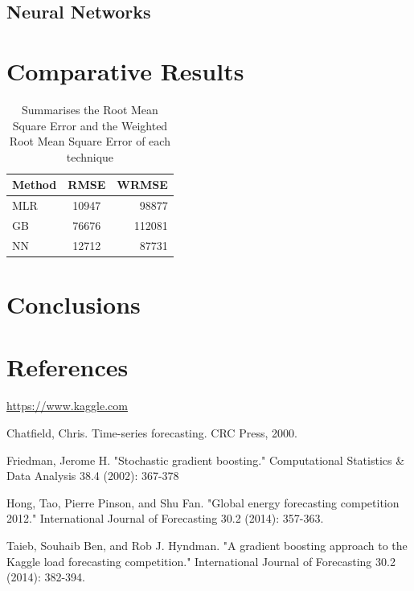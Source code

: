 \documentclass{article} %
\begin{document}
\subsection*{Neural Networks}

\section*{Comparative Results}

\begin{table}
  \begin{tabular}{l c r}
    Method  & RMSE & WRMSE \\
    \hline
    MLR     & 10947 & 98877 \\
    GB      & 76676 & 112081 \\
    NN      & 12712 & 87731 \\
  \end{tabular}
  \caption{Summarises the Root Mean Square Error and the Weighted Root Mean Square Error of each technique}
  \label{tab:error_comp}
\end{table}
\section*{Conclusions}


\section*{References}
\url{https://www.kaggle.com}


Chatfield, Chris. Time-series forecasting. CRC Press, 2000.

Friedman, Jerome H. "Stochastic gradient boosting." Computational Statistics \& Data Analysis 38.4 (2002): 367-378

Hong, Tao, Pierre Pinson, and Shu Fan. "Global energy forecasting competition 2012." International Journal of Forecasting 30.2 (2014): 357-363.

Taieb, Souhaib Ben, and Rob J. Hyndman. "A gradient boosting approach to the Kaggle load forecasting competition." International Journal of Forecasting 30.2 (2014): 382-394.
\end{document}
